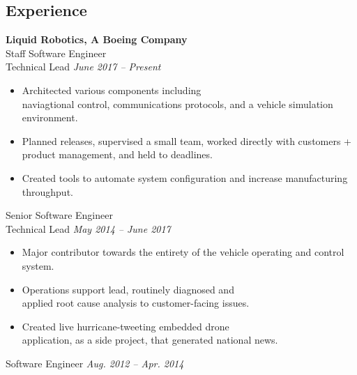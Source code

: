 \documentclass{article}
\begin{document}
{\begin{multicols}{2}
\section*{Experience}
\noindent
    \textbf{Liquid Robotics, A Boeing Company}\\
    Staff Software Engineer\\
    Technical Lead \hfill \textsl{June 2017 -- Present} \\
    \vspace{ -10px}
    \begin{itemize}[noitemsep,nolistsep]
        \item Architected various components including \\naviagtional control, communications protocols, and a vehicle simulation environment.
        \item Planned releases, supervised a small team, worked directly with customers + product management, and held to deadlines.
        \item Created tools to automate system configuration and increase manufacturing throughput.
    \end{itemize}
    \vspace{10px}
    Senior Software Engineer\\
    Technical Lead \hfill \textsl{May 2014 -- June 2017} \\
    \vspace{ -10px}
    \begin{itemize}[noitemsep,nolistsep]
    	\item Major contributor towards the entirety of the vehicle operating and control system.
         \item Operations support lead, routinely diagnosed and \\applied root cause analysis to customer-facing issues.
         \item Created live hurricane-tweeting embedded drone \\application, as a side project, that generated national news.
    \end{itemize}
    \vspace{10px}
    Software Engineer \hfill \textsl{Aug. 2012 -- Apr. 2014}\\
    \vspace{ -10px}

\end{multicols}}
\end{document}
